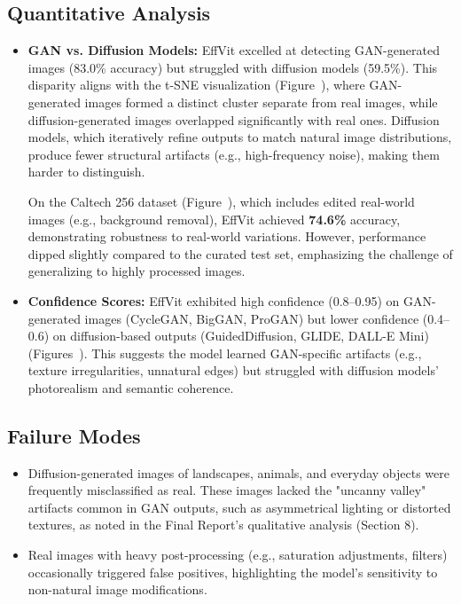 \documentclass{article} %
\begin{document}
\subsection{Quantitative Analysis}
\begin{itemize}
    \item \textbf{GAN vs. Diffusion Models:}
    EffVit excelled at detecting GAN-generated images (83.0\% accuracy) but struggled with diffusion models (59.5\%). This disparity aligns with the t-SNE visualization (Figure~), where GAN-generated images formed a distinct cluster separate from real images, while diffusion-generated images overlapped significantly with real ones. Diffusion models, which iteratively refine outputs to match natural image distributions, produce fewer structural artifacts (e.g., high-frequency noise), making them harder to distinguish.
    
    On the Caltech 256 dataset (Figure~), which includes edited real-world images (e.g., background removal), EffVit achieved \textbf{74.6\%} accuracy, demonstrating robustness to real-world variations. However, performance dipped slightly compared to the curated test set, emphasizing the challenge of generalizing to highly processed images.

    \item \textbf{Confidence Scores:}
    EffVit exhibited high confidence (0.8--0.95) on GAN-generated images (CycleGAN, BigGAN, ProGAN) but lower confidence (0.4--0.6) on diffusion-based outputs (GuidedDiffusion, GLIDE, DALL-E Mini) (Figures~). This suggests the model learned GAN-specific artifacts (e.g., texture irregularities, unnatural edges) but struggled with diffusion models' photorealism and semantic coherence.
\end{itemize}

\subsection{Failure Modes}
\begin{itemize}
    \item Diffusion-generated images of landscapes, animals, and everyday objects were frequently misclassified as real. These images lacked the "uncanny valley" artifacts common in GAN outputs, such as asymmetrical lighting or distorted textures, as noted in the Final Report's qualitative analysis (Section 8).  
    \item Real images with heavy post-processing (e.g., saturation adjustments, filters) occasionally triggered false positives, highlighting the model's sensitivity to non-natural image modifications.
\end{itemize}
\end{document}
